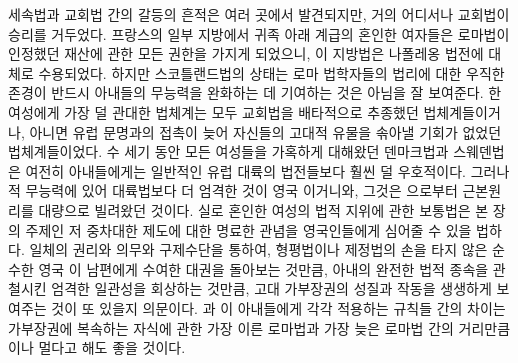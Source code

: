 세속법과 교회법 간의 갈등의 흔적은 여러 곳에서 발견되지만,
거의 어디서나 교회법이 승리를 거두었다.
프랑스의 일부 지방에서
귀족 아래 계급의 혼인한 여자들은
로마법이 인정했던 재산에 관한 모든 권한을 가지게 되었으니,
%
이 지방법은 나폴레옹 법전에 대체로 수용되었다.
하지만 스코틀랜드법의 상태는
로마 법학자들의 법리에 대한 우직한 존경이
반드시 아내들의 무능력을 완화하는 데 기여하는 것은 아님을 잘
보여준다.
한 여성에게 가장 덜 관대한 법체계는 모두
교회법을 배타적으로 추종했던 법체계들이거나,
아니면
유럽 문명과의 접촉이 늦어 자신들의 고대적 유물을 솎아낼 기회가 없었던
법체계들이었다.
수 세기 동안 모든 여성들을 가혹하게 대해왔던 덴마크법과 스웨덴법은
여전히 아내들에게는
일반적인 유럽 대륙의 법전들보다
훨씬 덜 우호적이다.
그러나 적 무능력에 있어 대륙법보다 더 엄격한 것이
영국 이거니와,
그것은 으로부터 근본원리를 대량으로 빌려왔던 것이다.
실로 혼인한 여성의 법적 지위에 관한 보통법은
본 장의 주제인 저 중차대한 제도에 대한 명료한 관념을
영국인들에게 심어줄 수 있을 법하다.
일체의 권리와 의무와 구제수단을 통하여,
형평법이나 제정법의 손을 타지 않은
순수한 영국 이
남편에게 수여한 대권을 돌아보는 것만큼,
아내의 완전한 법적 종속을 관철시킨 엄격한 일관성을 회상하는 것만큼,
고대 가부장권의 성질과 작동을 생생하게 보여주는 것이 또 있을지 의문이다.
과 이 아내들에게 각각 적용하는 규칙들 간의 차이는
가부장권에 복속하는 자식에 관한 가장 이른 로마법과 가장 늦은 로마법 간의
거리만큼이나 멀다고 해도 좋을 것이다.

